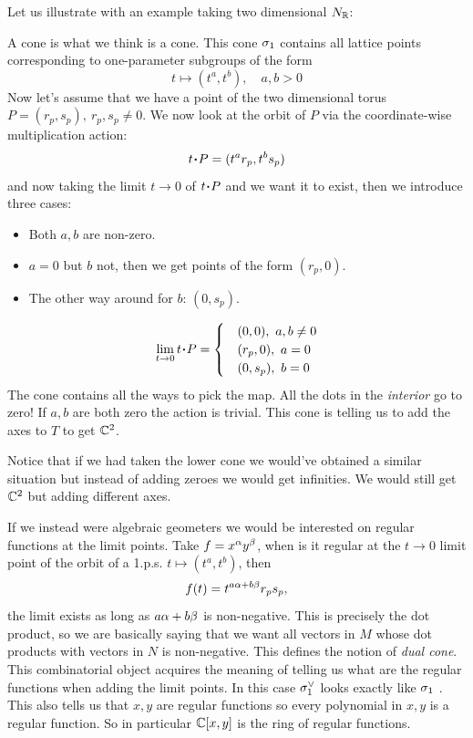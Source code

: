 \documentclass[12pt]{memoir}
\theoremstyle{definition}
\def\al{\alpha}
\begin{document}
Let us illustrate with an example taking two dimensional $N_{\mathbb{R}}$:

\begin{Ex}
    A cone is what we think is a cone.
This cone $\sigma_1$ contains all lattice points corresponding to one-parameter subgroups of the form 
$$t\mapsto (t^a,t^b),\quad a,b>0$$
Now let's assume that we have a point of the two dimensional torus $P=(r_p,s_p),\ r_p,s_p\neq 0$. We now look at the orbit of $P$ via the coordinate-wise multiplication action:
$$t\.P=(t^ar_p,t^bs_p)$$
and now taking the limit $t\to 0$ of $t\.P$ and we want it to exist, then we introduce three cases:
\begin{itemize}
    \item Both $a,b$ are non-zero.
    \item $a=0$ but $b$ not, then we get points of the form $(r_p,0)$.
    \item The other way around for $b$: $(0,s_p)$.
\end{itemize}
$$\lim_{t\to 0}t\.P=\begin{cases}
    &(0,0),\ a,b\neq0\\
    &(r_p,0),\ a=0\\
    &(0,s_p),\ b=0
\end{cases}$$
The cone contains all the ways to pick the map. All the dots in the \emph{interior} go to zero! If $a,b$ are both zero the action is trivial. This cone is telling us to add the axes to $T$ to get $\mathbb{C}^2$.\par 
Notice that if we had taken the lower cone we would've obtained a similar situation but instead of adding zeroes we would get infinities. We would still get $\mathbb{C}^2$ but adding different axes.\par 
If we instead were algebraic geometers we would be interested on regular functions at the limit points. Take $f=x^\al y^\bt$, when is it regular at the $t\to 0$ limit point of the orbit of a 1.p.s. $t\mapsto (t^a,t^b)$, then 
$$f(t)=t^{a\al+b\bt}r_ps_p,$$
the limit exists as long as $a\al+b\bt$ is non-negative. This is precisely the dot product, so we are basically saying that we want all vectors in $M$ whose dot products with vectors in $N$ is non-negative. This defines the notion of \emph{dual cone}. This combinatorial object acquires the meaning of telling us what are the regular functions when adding the limit points. In this case $\sigma_1^\lor$ looks exactly like $\sigma_1$ . This also tells us that $x,y$ are regular functions so every polynomial in $x,y$ is a regular function. So in particular $\mathbb{C}[x,y]$ is the ring of regular functions. 
\end{Ex}
\end{document}
